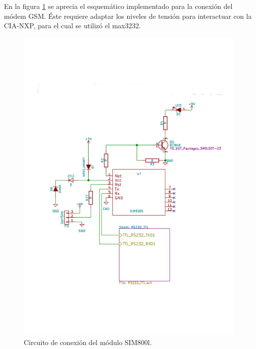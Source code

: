 En la figura \ref{fig:essim800} se aprecia el esquemático implementado para la conexión del módem GSM. Éste requiere adaptar los niveles de tensión para interactuar con la CIA-NXP, para el cual se utilizó el max3232.
\begin{figure}[!hp]
  \centering
  \includegraphics[page=1,scale=0.5,clip,trim=1cm 4.7cm 1.2cm 6.5cm]{./Figures/sch_modem_sim800.pdf}
  \caption{Circuito de conexión del módulo SIM800l.}
  \label{fig:essim800}
\end{figure}


